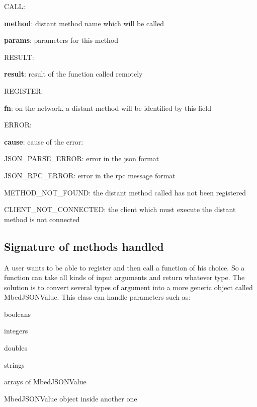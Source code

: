 \documentclass[pdftex,10pt,a4paper]{report}
\newenvironment{packed_item}{
\begin{itemize}
  \setlength{\itemsep}{1pt}
  \setlength{\parskip}{0pt}
  \setlength{\parsep}{0pt}
}{\end{itemize}}
\begin{document}
\begin{packed_item}
	\item CALL:
		\begin{packed_item}
			\item \textbf{method}: distant method name which will be called
			\item \textbf{params}: parameters for this method
		\end{packed_item}
	\item RESULT:
		\begin{packed_item}
			\item \textbf{result}: result of the function called remotely
		\end{packed_item}
	\item REGISTER:
		\begin{packed_item}
			\item \textbf{fn}: on the network, a distant method will be identified by this field
		\end{packed_item}
	\item ERROR:
		\begin{packed_item}
			\item \textbf{cause}: cause of the error:
			\begin{packed_item}
				\item JSON\_PARSE\_ERROR: error in the json format
				\item JSON\_RPC\_ERROR: error in the rpc message format
				\item METHOD\_NOT\_FOUND: the distant method called has not been registered
				\item CLIENT\_NOT\_CONNECTED: the client which must execute the distant method is not connected
			\end{packed_item}
		\end{packed_item}
\end{packed_item}

\subsection{Signature of methods handled}
A user wants to be able to register and then call a function of his choice. So a function can take all kinds of input arguments and return whatever type. The solution is to convert several types of argument into a more generic object called MbedJSONValue. This class can handle parameters such as:
\begin{packed_item}
	\item booleans
	\item integers
	\item doubles
	\item strings
	\item arrays of MbedJSONValue
	\item MbedJSONValue object inside another one
\end{packed_item}
\end{document}

